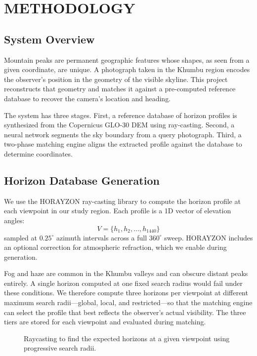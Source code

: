 \chapter{METHODOLOGY}

\section{System Overview}
Mountain peaks are permanent geographic features whose shapes, as seen from a given coordinate, are unique. A photograph taken in the Khumbu region encodes the observer's position in the geometry of the visible skyline. This project reconstructs that geometry and matches it against a pre-computed reference database to recover the camera's location and heading.

The system has three stages. First, a reference database of horizon profiles is synthesized from the Copernicus GLO-30 DEM using ray-casting. Second, a neural network segments the sky boundary from a query photograph. Third, a two-phase matching engine aligns the extracted profile against the database to determine coordinates.

\section{Horizon Database Generation}
We use the HORAYZON ray-casting library \cite{Steger2022} to compute the horizon profile at each viewpoint in our study region. Each profile is a 1D vector of elevation angles:
\begin{equation}
    V = \{h_1, h_2, \dots, h_{1440}\}
\end{equation}
sampled at $0.25^\circ$ azimuth intervals across a full $360^\circ$ sweep. HORAYZON includes an optional correction for atmospheric refraction, which we enable during generation.

Fog and haze are common in the Khumbu valleys and can obscure distant peaks entirely. A single horizon computed at one fixed search radius would fail under these conditions. We therefore compute three horizons per viewpoint at different maximum search radii---global, local, and restricted---so that the matching engine can select the profile that best reflects the observer's actual visibility. The three tiers are stored for each viewpoint and evaluated during matching.

\begin{figure}[htbp]
    \centering
    \resizebox{\textwidth}{!}{}
    \caption{Raycasting to find the expected horizons at a given viewpoint using progressive search radii.}
    \label{fig:design}
\end{figure}

